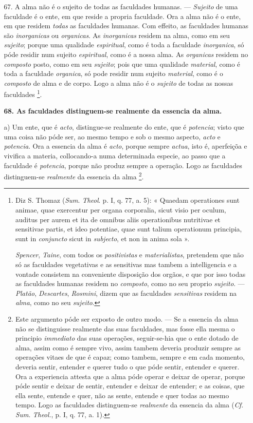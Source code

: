 67. A alma não é o sujeito de todas as faculdades humanas. --- \emph{Sujeito} de uma faculdade é o ente, em que reside a propria faculdade. Ora a alma não é o ente, em que residem \emph{todas} as faculdades humanas. Com effeito, as faculdades humanas são \emph{inorganicas} ou \emph{organicas}. As \emph{inorganicas} residem na alma, como em seu \emph{sujeito}; porque uma qualidade \emph{espiritual}, como é toda a faculdade \emph{inorganica}, só póde residir num sujeito \emph{espiritual}, como é a nossa alma. As \emph{organicas} residem no \emph{composto}  posto, como em seu \emph{sujeito}; pois que uma qualidade \emph{material}, como é toda a faculdade \emph{organica}, só pode residir num sujeito \emph{material}, como é o \emph{composto} de alma e de corpo. Logo a alma não é o \emph{sujeito} de todas as nossas faculdades \footnote{Diz S. Thomaz (\emph{Sum}. \emph{Theol}. p. I, q. 77, a. 5): « Quaedam operationes sunt animae, quae exercentur per organa corporalia, sicut visio per oculum, auditus per aurem et ita de omnibus aliis operationibus nutritivae et sensitivae partis, et ideo potentiae, quae sunt talium operationum principia, sunt in \emph{conjuncto} sicut in \emph{subjecto}, et non in anima sola ».\par \emph{Spencer}, \emph{Taine}, com todos os \emph{positivistas} e \emph{materialistas}, pretendem que não só as faculdades vegetativas e as sensitivas mas tambem a intelligencia e a vontade consistem na conveniente disposição dos orgãos, e que por isso todas as faculdades humanas residem no \emph{composto}, como no seu proprio \emph{sujeito}. --- \emph{Platão}, \emph{Descartes}, \emph{Rosmini}, dizem que as faculdades \emph{sensitivas} residem na \emph{alma}, como no seu \emph{sujeito}.}.

\textbf{68. As faculdades distinguem-se realmente da essencia da alma.}

a) Um ente, que é \emph{acto}, distingue-se realmente do ente, que é \emph{potencia}; visto que uma coisa não póde ser, ao mesmo tempo e sob o mesmo aspecto, \emph{acto} e \emph{potencia}. Ora a essencia da alma é \emph{acto}, porque sempre \emph{actua}, isto é, aperfeiçõa e vivifica a materia, collocando-a numa determinada especie, ao passo que a faculdade é \emph{potencia}, porque não produz sempre a operação. Logo as faculdades distinguem-se \emph{realmente} da essencia da alma \footnote{Este argumento póde ser exposto de outro modo. --- Se a essencia da alma não se distinguisse realmente das suas faculdades, mas fosse ella mesma o principio \emph{immediato} das suas operações, seguir-se-hia que o ente dotado de alma, assim como é sempre vivo, assim tambem deveria produzir sempre as operações vitaes de que é capaz; como tambem, sempre e em cada momento, deveria sentir, entender e querer tudo o que póde sentir, entender e querer. Ora a experiencia attesta que a alma póde operar e deixar de operar, porque póde sentir e deixar de sentir, entender e deixar de entender; e as coisas, que ella sente, entende e quer, não as sente, entende e quer todas ao mesmo tempo. Logo as faculdades distinguem-se \emph{realmente} da essencia da alma (\emph{Cf.} \emph{Sum}. \emph{Theol.}, p. I, q. 77, a. 1).}.

